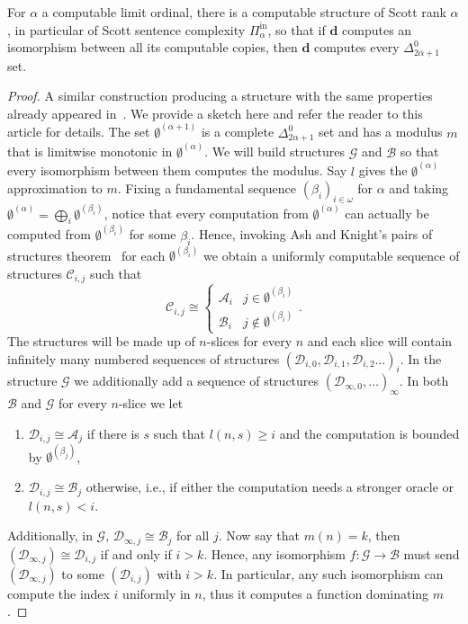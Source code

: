 \documentclass{amsart}
\newcommand\+[1]{\mathcal{#1}}
\renewcommand\*[1]{\mathbf{#1}}
\renewcommand\=[1]{\text{#1}}
\renewcommand\*[1]{\mathbf{#1}}
\newcommand{\A}{\mathcal{A}}
\newcommand{\B}{\mathcal{B}}
\newcommand{\Pinf}[1]{\Pi^{\mathrm{in}}_{#1}}
\newcommand{\nat}{\omega}
\begin{document}
 \begin{lemma}\label{thm:limithighforsr}For $\alpha$ a computable limit ordinal, there is a computable structure of Scott rank $\alpha$, in particular of Scott sentence complexity $\Pinf{\alpha}$, so that if $\*d$ computes an isomorphism between all its computable copies, then $\*d$ computes every $\Delta^0_{2\alpha+1}$ set.
 \end{lemma}
 \begin{proof}
   A similar construction producing a structure with the same properties already appeared in~\cite{csima2020}. We provide a sketch here and refer the reader to this article for details. The set $\emptyset^{(\alpha+1)}$ is a complete $\Delta^0_{2\alpha+1}$ set and has a modulus $m$ that is limitwise monotonic in $\emptyset^{(\alpha)}$. We will build structures $\+G$ and $\B$ so that every isomorphism between them computes the modulus. Say $l$ gives the $\emptyset^{(\alpha)}$ approximation to $m$. Fixing a fundamental sequence $(\beta_i)_{i\in \nat}$ for $\alpha$ and taking $\emptyset^{(\alpha)}=\bigoplus_i \emptyset^{(\beta_i)}$, notice that every computation from $\emptyset^{(\alpha)}$ can actually be computed from $\emptyset^{(\beta_i)}$ for some $\beta_i$. 
   Hence, invoking Ash and Knight's pairs of structures theorem~\cite{ash1990} for each $\emptyset^{(\beta_i)}$ we obtain a uniformly computable sequence of structures $\+C_{i,j}$ such that
   \[ \+C_{i,j}\cong\begin{cases} \A_i & j\in \emptyset^{(\beta_i)}\\
   \B_i & j\notin \emptyset^{(\beta_i)}\end{cases}.\]
   The structures will be made up of $n$-slices for every $n$ and each slice will contain infinitely many numbered sequences of structures $(\+D_{i,0},\+D_{i,1},\+D_{i,2}\dots)_i$. In the structure $\+G$ we additionally add a sequence of structures $(\+D_{\infty,0},\dots)_\infty$. In both $\B$ and $\+G$ for every $n$-slice we let
   \begin{enumerate}
     \item $\+D_{i,j}\cong \A_j$ if there is $s$ such that $l(n,s)\geq i$ and the computation is bounded by $\emptyset^{(\beta_j)}$,
   \item $\+D_{i,j}\cong \B_j$ otherwise, i.e., if either the computation needs a stronger oracle or $l(n,s)<i$.
   \end{enumerate}
   Additionally, in $\+G$, $\+D_{\infty,j}\cong \B_j$ for all $j$. Now say that $m(n)=k$, then $(\+D_{\infty,j})\cong \+D_{i,j}$ if and only if $i>k$. Hence, any isomorphism $f:\+G\to \B$ must send $(\+D_{\infty,j})$ to some $(\+D_{i,j})$ with $i>k$. In particular, any such isomorphism can compute the index $i$ uniformly in $n$, thus it computes a function dominating $m$.


\end{proof}
\end{document}
